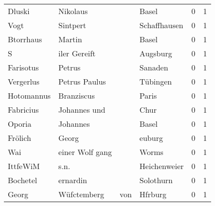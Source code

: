 \begin{center}
\begin{tiny}
\begin{longtabu}{llllrr}
                   Dluski &                           Nikolaus &             &                                       Basel &          0 &         1 \\
                     Vogt &                           Sintpert &             &                                Schaffhausen &          0 &         1 \\
                Btorrhaus &                             Martin &             &                                       Basel &          0 &         1 \\
                        S &                       iler Gereift &             &                                    Augsburg &          0 &         1 \\
                Farisotus &                             Petrus &             &                                     Sanaden &          0 &         1 \\
                Vergerlus &                      Petrus Paulus &             &                                    Tübingen &          0 &         1 \\
               Hotomannus &                         Branziscus &             &                                       Paris &          0 &         1 \\
                Fabricius &                       Johannes und &             &                                        Chur &          0 &         1 \\
                   Oporia &                           Johannes &             &                                       Basel &          0 &         1 \\
                  Frölich &                              Georg &             &                                      euburg &          0 &         1 \\
                      Wai &                    einer Wolf gang &             &                                       Worms &          0 &         1 \\
                 IttfeWiM &                               s.n. &             &                                Heichenweier &          0 &         1 \\
                 Bochetel &                           ernardin &             &                                   Solothurn &          0 &         1 \\
                    Georg &                        Wüfctemberg &         von &                                     Hfrburg &          0 &         1 \\

\end{longtabu}
\end{tiny}
\end{center}

